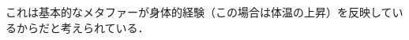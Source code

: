 \documentclass[11pt]{beamer}
\newlength{\la}
\let\oldcitep=\citep
\renewcommand\citep[1]{\hyperlink{#1}{\oldcitep{#1}}}
\newcommand\emoji[1]{\hspace{.25\zw}\raisebox{-2pt}{\href{https://commons.wikimedia.org/wiki/File:Emoji_#1.svg}{\texttt{[image: emoji/Emoji\_\#1.pdf]}}\hspace{.25\zw}}}
\newcommand\brightness{\emoji{u1f506}}
\begin{document}
\begin{frame}
\begin{enumerate}
\begin{itemize}
        \end{itemize}
        これは基本的なメタファーが身体的経験（この場合は体温の上昇）を反映しているからだと考えられている．
    \end{enumerate}

\end{frame}
\end{document}
